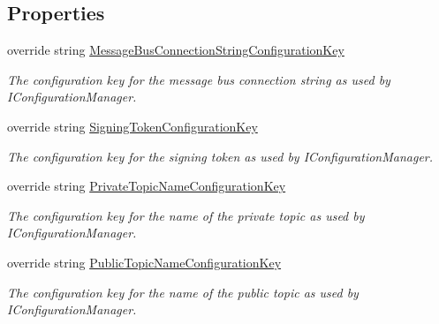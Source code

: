 \subsection*{Properties}
\begin{DoxyCompactItemize}
\item 
override string \hyperlink{classCqrs_1_1Azure_1_1ServiceBus_1_1AzureEventBus_a01cf73f187e77b2116e1f7dc68c3e7e6_a01cf73f187e77b2116e1f7dc68c3e7e6}{Message\+Bus\+Connection\+String\+Configuration\+Key}
\begin{DoxyCompactList}\small\item\em The configuration key for the message bus connection string as used by I\+Configuration\+Manager. \end{DoxyCompactList}\item 
override string \hyperlink{classCqrs_1_1Azure_1_1ServiceBus_1_1AzureEventBus_a9e7e85ab8c11f498539100d058d89fd0_a9e7e85ab8c11f498539100d058d89fd0}{Signing\+Token\+Configuration\+Key}
\begin{DoxyCompactList}\small\item\em The configuration key for the signing token as used by I\+Configuration\+Manager. \end{DoxyCompactList}\item 
override string \hyperlink{classCqrs_1_1Azure_1_1ServiceBus_1_1AzureEventBus_a822a0946e9848950c8be3b8f423fe20a_a822a0946e9848950c8be3b8f423fe20a}{Private\+Topic\+Name\+Configuration\+Key}
\begin{DoxyCompactList}\small\item\em The configuration key for the name of the private topic as used by I\+Configuration\+Manager. \end{DoxyCompactList}\item 
override string \hyperlink{classCqrs_1_1Azure_1_1ServiceBus_1_1AzureEventBus_a8428d6c874f19d4ae0cc42bb6ae3ab6d_a8428d6c874f19d4ae0cc42bb6ae3ab6d}{Public\+Topic\+Name\+Configuration\+Key}
\begin{DoxyCompactList}\small\item\em The configuration key for the name of the public topic as used by I\+Configuration\+Manager. \end{DoxyCompactList}\item 

\end{DoxyCompactItemize}
